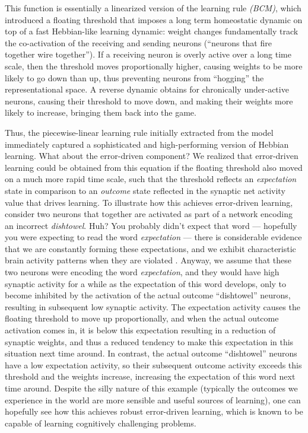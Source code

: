 \documentclass[11pt,twoside]{article}
\begin{document}
This function is essentially a linearized version of the
 learning rule {\em (BCM)}, which
introduced a floating threshold that imposes a long term homeostatic
dynamic on top of a fast Hebbian-like learning dynamic: weight changes
fundamentally track the co-activation of the receiving and sending
neurons (``neurons that fire together wire together'').  If a
receiving neuron is overly active over a long time scale, then the
threshold moves proportionally higher, causing weights to be more
likely to go down than up, thus preventing neurons from ``hogging''
the representational space.  A reverse dynamic obtains for chronically
under-active neurons, causing their threshold to move down, and making
their weights more likely to increase, bringing them back into the
game.

Thus, the piecewise-linear learning rule initially extracted from the
 model immediately captured a
sophisticated and high-performing version of Hebbian learning. What
about the error-driven component?  We realized that error-driven
learning could be obtained from this equation if the floating
threshold also moved on a much more rapid time scale, such that the
threshold reflects an {\em expectation} state in comparison to an {\em
  outcome} state reflected in the synaptic net activity value that
drives learning.  To illustrate how this achieves error-driven
learning, consider two neurons that together are activated as part of
a network encoding an incorrect {\em dishtowel}.  Huh?  You probably
didn't expect that word --- hopefully you were expecting to read the
word {\em expectation} --- there is considerable evidence that we are
constantly forming these expectations, and we exhibit characteristic
brain activity patterns when they are violated \cite{P300}.  Anyway,
we assume that these two neurons were encoding the word {\em
  expectation}, and they would have high synaptic activity for a while
as the expectation of this word develops, only to become inhibited by
the activation of the actual outcome ``dishtowel'' neurons, resulting
in subsequent low synaptic activity.  The expectation activity causes
the floating threshold to move up proportionally, and when the actual
outcome activation comes in, it is below this expectation resulting in
a reduction of synaptic weights, and thus a reduced tendency to make
this expectation in this situation next time around.  In contrast, the
actual outcome ``dishtowel'' neurons have a low expectation activity,
so their subsequent outcome activity exceeds this threshold and the
weights increase, increasing the expectation of this word next time
around.  Despite the silly nature of this example (typically the
outcomes we experience in the world are more sensible and useful
sources of learning), one can hopefully see how this achieves robust
error-driven learning, which is known to be capable of learning
cognitively challenging problems.
\end{document}
